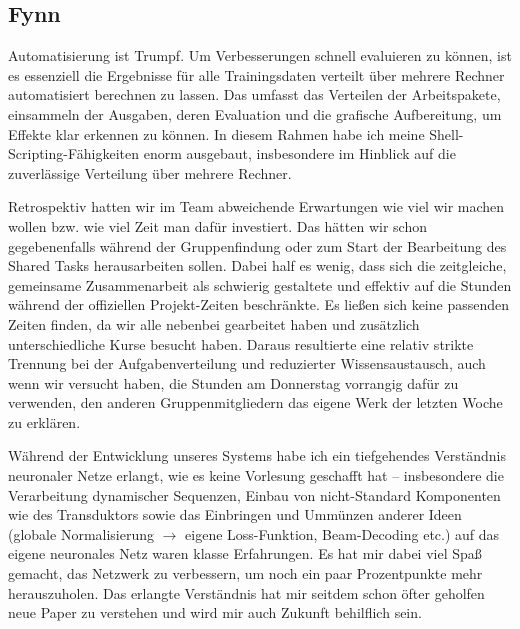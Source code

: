 \documentclass[11pt,a4paper]{article}
\begin{document}
\subsection{Fynn}
Automatisierung ist Trumpf.
Um Verbesserungen schnell evaluieren zu können, ist es essenziell die Ergebnisse für alle Trainingsdaten verteilt über mehrere Rechner automatisiert berechnen zu lassen.
Das umfasst das Verteilen der Arbeitspakete, einsammeln der Ausgaben, deren Evaluation und die grafische Aufbereitung, um Effekte klar erkennen zu können.
In diesem Rahmen habe ich meine Shell-Scripting-Fähigkeiten enorm ausgebaut, insbesondere im Hinblick auf die zuverlässige Verteilung über mehrere Rechner.

Retrospektiv hatten wir im Team abweichende Erwartungen wie viel wir machen wollen bzw. wie viel Zeit man dafür investiert.
Das hätten wir schon gegebenenfalls während der Gruppenfindung oder zum Start der Bearbeitung des Shared Tasks herausarbeiten sollen.
Dabei half es wenig, dass sich die zeitgleiche, gemeinsame Zusammenarbeit als schwierig gestaltete und effektiv auf die Stunden während der offiziellen Projekt-Zeiten beschränkte.
Es ließen sich keine passenden Zeiten finden, da wir alle nebenbei gearbeitet haben und zusätzlich unterschiedliche Kurse besucht haben.
Daraus resultierte eine relativ strikte Trennung bei der Aufgabenverteilung und reduzierter Wissensaustausch, auch wenn wir versucht haben, die Stunden am Donnerstag vorrangig dafür zu verwenden, den anderen Gruppenmitgliedern das eigene Werk der letzten Woche zu erklären.

Während der Entwicklung unseres Systems habe ich ein tiefgehendes Verständnis neuronaler Netze erlangt, wie es keine Vorlesung geschafft hat -- insbesondere die Verarbeitung dynamischer Sequenzen, Einbau von nicht-Standard Komponenten wie des Transduktors sowie das Einbringen und Ummünzen anderer Ideen (globale Normalisierung $\to$ eigene Loss-Funktion, Beam-Decoding etc.) auf das eigene neuronales Netz waren klasse Erfahrungen.
Es hat mir dabei viel Spaß gemacht, das Netzwerk zu verbessern, um noch ein paar Prozentpunkte mehr herauszuholen.
Das erlangte Verständnis hat mir seitdem schon öfter geholfen neue Paper zu verstehen und wird mir auch Zukunft behilflich sein.

\end{document}
